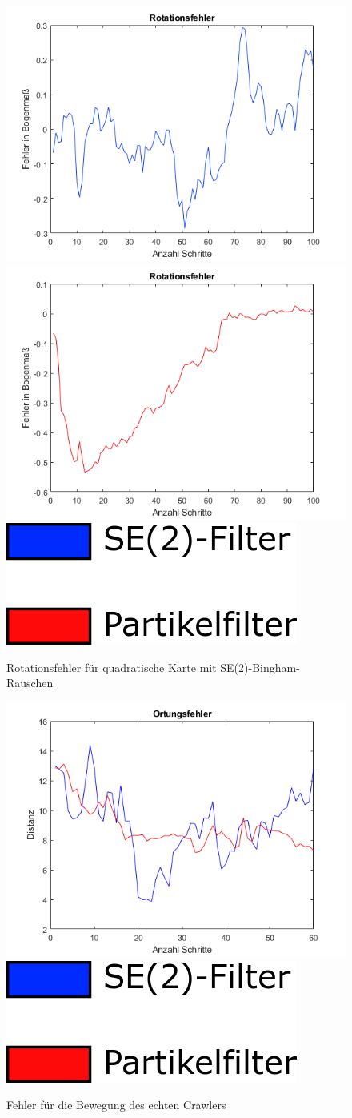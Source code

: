\begin{figure}[h!]
	\centering
	\includegraphics[width=0.40\linewidth]{Images/rotSE2.png}
	\includegraphics[width=0.40\linewidth]{Images/rotation.png}
	\includegraphics[width =0.18\linewidth]{Images/Legende.png}

	\caption{Rotationsfehler für quadratische Karte mit SE(2)-Bingham-Rauschen}
	\label{fig:roterror}
\end{figure}

\begin{figure}[h!]
	\centering
	\includegraphics[width=0.60\linewidth]{Images/se2ErrorRealBoth.png}
	\includegraphics[width =0.18\linewidth]{Images/Legende.png}

	\caption{Fehler für die Bewegung des echten Crawlers}
	\label{fig:real}
\end{figure}
